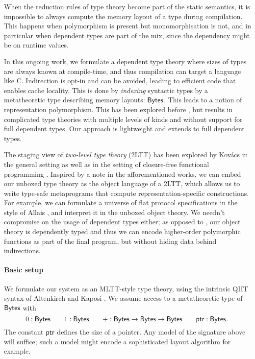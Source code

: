 When the reduction rules of type theory become part of the static semantics, it
is impossible to always compute the memory layout of a type during compilation.
This happens when polymorphism is present but monomorphisation is not, and in
particular when dependent types are part of the mix, since the dependency might
be on runtime values.

In this ongoing work, we formulate a dependent type theory where sizes of types
are always known at compile-time, and thus compilation can target a language
like C. Indirection is opt-in and can be avoided, leading to efficient code that
enables cache locality. This is done by \emph{indexing} syntactic types by a
metatheoretic type describing memory layouts: $\textsf{Bytes}$. This leads to a notion
of representation polymorphism. This has been explored before
\cite{Downen2024-nk}, but results in complicated type theories with multiple
levels of kinds and without support for full dependent types. Our approach
is lightweight and extends to full dependent types.

The staging view of \emph{two-level type theory} (2LTT) \cite{Annenkov2023-vk}
has been explored by Kov\'acs in the general setting \cite{Kovacs2022-rf} as
well as in the setting of closure-free functional programming
\cite{Kovacs2024-hn}. Inspired by a note in the afforementioned works, we can embed
our unboxed type theory as the object language of a 2LTT, which allows us to
write type-safe metaprograms that compute representation-specific constructions.
For example, we can formulate a universe of flat protocol specifications in the
style of Allais \cite{Allais2023-zq}, and interpret it in the unboxed object
theory. We needn't compromise on the usage of dependent types either; as opposed
to \cite{Kovacs2024-hn}, our object theory is dependently typed and thus we can
encode higher-order polymorphic functions as part of the final program, but
without hiding data behind indirections.

\paragraph{Basic setup}
We formulate our system as an MLTT-style type theory, using the intrinsic QIIT
syntax of Altenkirch and Kaposi \cite{Altenkirch2016-zc}.
We assume access to a metatheoretic type of
\(\textsf{Bytes}\) with
\[
0 : \textsf{Bytes} \qquad 1 : \textsf{Bytes} \qquad + : \textsf{Bytes} \to \textsf{Bytes} \to \textsf{Bytes} \qquad \textsf{ptr} : \textsf{Bytes} \,.
\]
The constant \(\textsf{ptr}\) defines the size of a pointer. Any model of
the signature above will suffice; such a model might encode a sophisticated
layout algorithm for example.

